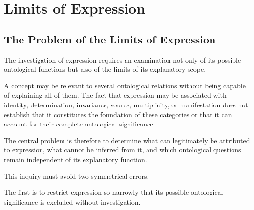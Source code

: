 %
%

\section{Limits of Expression}
\label{sec:limits-of-expression}

\subsection{The Problem of the Limits of Expression}

The investigation of expression requires an examination
not only of its possible ontological functions but also
of the limits of its explanatory scope.

A concept may be relevant to several ontological relations
without being capable of explaining all of them. The fact
that expression may be associated with identity, determination,
invariance, source, multiplicity, or manifestation does
not establish that it constitutes the foundation of these
categories or that it can account for their complete
ontological significance.

The central problem is therefore to determine what can
legitimately be attributed to expression, what cannot
be inferred from it, and which ontological questions
remain independent of its explanatory function.

This inquiry must avoid two symmetrical errors.

The first is to restrict expression so narrowly that
its possible ontological significance is excluded
without investigation.

